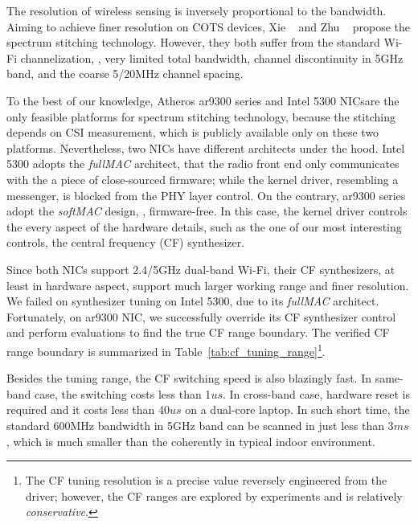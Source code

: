 


The resolution of wireless sensing is inversely proportional to the bandwidth. 
Aiming to achieve finer resolution on COTS devices, 
Xie \etal~\cite{Xie2015Precise} and Zhu \etal~\cite{Zhu:2018fc} 
propose the spectrum stitching technology.
However, they both suffer from the standard Wi-Fi channelization, \ie,
very limited total bandwidth,
channel discontinuity in 5GHz band,
and the coarse 5/20MHz channel spacing.

To the best of our knowledge,
Atheros ar9300 series and Intel 5300 NICsare 
the only feasible platforms for spectrum stitching technology,
because the stitching depends on CSI measurement, 
which is publicly available only on these two platforms\cite{csitool, Xie2015Precise}.
Nevertheless, two NICs have different architects under the hood.
%
Intel 5300 adopts the \textit{fullMAC} architect, 
that the radio front end only communicates with the a piece of close-sourced firmware;
while the kernel driver, resembling a messenger, is blocked from the PHY layer control.
%
On the contrary, ar9300 series adopt the \textit{softMAC} design, \ie, firmware-free.
In this case, the kernel driver controls the every aspect of the hardware details, 
such as the one of our most interesting controls, the central frequency (CF) synthesizer.

Since both NICs support 2.4/5GHz dual-band Wi-Fi, 
their CF synthesizers, at least in hardware aspect, support much larger working range and finer resolution.
We failed on synthesizer tuning on Intel 5300, due to its \textit{fullMAC} architect.
Fortunately, on ar9300 NIC, we successfully override its CF synthesizer control and perform evaluations to find the true CF range boundary. The verified CF range boundary is summarized in Table~\ref{tab:cf_tuning_range}\footnote{The CF tuning resolution is a precise value reversely engineered from the driver; however, the CF ranges are explored by experiments and is relatively \textit{conservative}.}. 

Besides the tuning range, 
the CF switching speed is also blazingly fast. 
In same-band case, the switching costs less than 1$us$. 
In cross-band case, hardware reset is required 
and it costs less than 40$us$ on a dual-core laptop.
In such short time, the standard 600MHz bandwidth in 5GHz band can be scanned in just less than 3$ms$, which is much smaller than the coherently in typical indoor environment.




